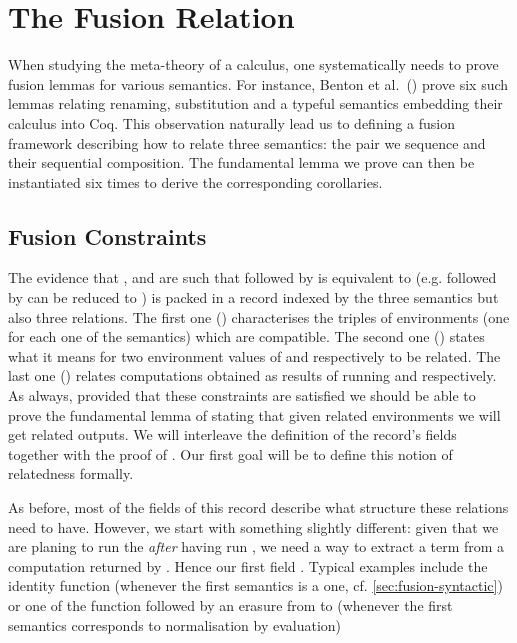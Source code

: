 \chapter{The Fusion Relation}
\label{sec:fusionrel}

When studying the meta-theory of a calculus, one systematically needs to prove
fusion lemmas for various semantics. For instance, Benton et al.~(\citeyear{benton2012strongly})
prove six such lemmas relating renaming, substitution and a typeful semantics
embedding their calculus into Coq. This observation naturally lead us to
defining a fusion framework describing how to relate three semantics: the pair
we sequence and their sequential composition. The fundamental lemma we prove
can then be instantiated six times to derive the corresponding corollaries.

\section{Fusion Constraints}

The evidence that ,  and  are such that  followed
by  is equivalent to  (e.g.  followed by 
can be reduced to ) is packed in a record  indexed by the
three semantics but also three relations. The first one () characterises the
triples of environments (one for each one of the semantics) which are compatible.
The second one () states what it means for two environment values of 
and  respectively to be related. The last one () relates computations
obtained as results of running  and  respectively.
%
As always, provided that these constraints are satisfied we should be able
to prove  the fundamental lemma of  stating that given
related environments we will get related outputs. We will interleave the
definition of the record's fields together with the proof of .
Our first goal will be to define this notion of relatedness formally.

\begin{AgdaSuppressSpace}
\end{AgdaSuppressSpace}

As before, most of the fields of this record describe what structure these
relations need to have. However, we start with something slightly different:
given that we are planing to run the   \emph{after}
having run , we need a way to extract a term from a computation
returned by . Hence our first field . Typical examples
include the identity function (whenever the first semantics is a 
one, cf. \cref{sec:fusion-syntactic}) or one of the  function
followed by an erasure from  to  (whenever the first semantics
corresponds to normalisation by evaluation)


